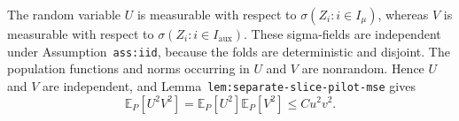 The random variable \(U\) is measurable with respect to \(\sigma(Z_i:i\in I_\mu)\), whereas \(V\) is measurable with respect to \(\sigma(Z_i:i\in I_{\mathrm{aux}})\). These sigma-fields are independent under Assumption~\texttt{ass:iid}, because the folds are deterministic and disjoint. The population functions and norms occurring in \(U\) and \(V\) are nonrandom. Hence \(U\) and \(V\) are independent, and Lemma~\texttt{lem:separate-slice-pilot-mse} gives
\[
\mathbb E_P[U^2V^2]=\mathbb E_P[U^2]\mathbb E_P[V^2]\le Cu^2v^2.
\]